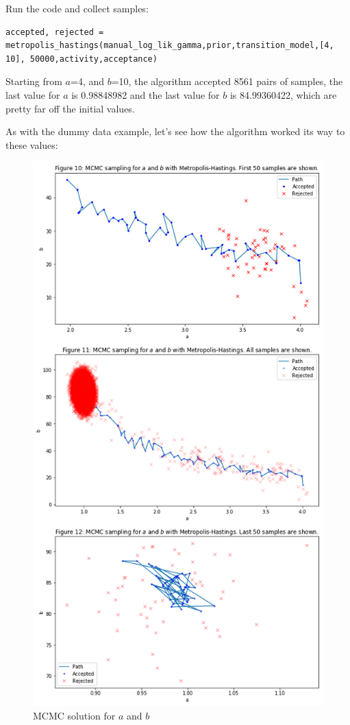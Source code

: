 Run the code and collect samples:
\begin{lstlisting}
accepted, rejected = metropolis_hastings(manual_log_lik_gamma,prior,transition_model,[4, 10], 50000,activity,acceptance)
\end{lstlisting}
Starting from $a$=4, and $b$=10, the algorithm accepted 8561 pairs of samples, the last value for $a$ is 0.98848982 and the last value for $b$ is 84.99360422, which are pretty far off the initial values.

As with the dummy data example, let's see how the algorithm worked its way to these values:

\begin{figure}[h]
    \centering
\includegraphics[width=.8\textwidth]{pic/p05c08-snip11}
    \caption{MCMC solution for $a$ and $b$}
    \label{fig:p05c08-snip11}
\end{figure}

